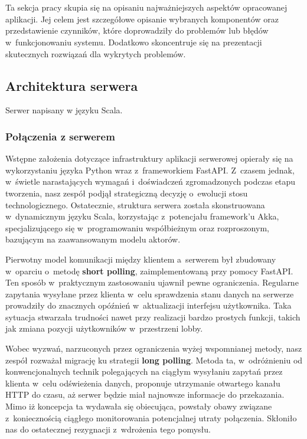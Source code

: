 \chapter{\ChapterTitleRealizationAspects}
\label{sec:wybrane-aspekty-realizacji}

Ta sekcja pracy skupia się na opisaniu najważniejszych aspektów
opracowanej aplikacji.
Jej celem jest szczegółowe opisanie wybranych
komponentów oraz przedstawienie czynników, które doprowadziły do
problemów lub błędów w~funkcjonowaniu systemu. Dodatkowo skoncentruje
się na prezentacji skutecznych rozwiązań dla wykrytych problemów.

\section{Architektura serwera}
Serwer napisany w języku Scala.






\subsection{Połączenia z serwerem}
Wstępne założenia dotyczące infrastruktury aplikacji
serwerowej opierały się na wykorzystaniu języka Python
wraz z~frameworkiem FastAPI. Z~czasem jednak, w~świetle
narastających wymagań i~doświadczeń zgromadzonych
podczas etapu tworzenia, nasz zespół podjął
strategiczną decyzję o~ewolucji stosu technologicznego.
Ostatecznie, struktura serwera została skonstruowana
w~dynamicznym języku Scala, korzystając z~potencjału
framework'u Akka, specjalizującego się w~programowaniu
współbieżnym oraz rozproszonym, bazującym na
zaawansowanym modelu aktorów.

Pierwotny model komunikacji między klientem a~serwerem
był zbudowany w~oparciu o~metodę \textbf{short polling},
zaimplementowaną przy pomocy FastAPI. Ten sposób
w~praktycznym zastosowaniu ujawnił pewne ograniczenia.
Regularne zapytania wysyłane przez klienta w~celu
sprawdzenia stanu danych na serwerze prowadziły do
znacznych opóźnień w~aktualizacji interfejsu
użytkownika. Taka sytuacja stwarzała trudności nawet
przy realizacji bardzo prostych funkcji, takich jak
zmiana pozycji użytkowników w~przestrzeni lobby.

Wobec wyzwań, narzuconych przez ograniczenia wyżej wspomnianej metody, nasz
zespół rozważał migrację ku strategii \textbf{long polling}. Metoda ta,
w~odróżnieniu od konwencjonalnych technik polegających na ciągłym
wysyłaniu zapytań przez klienta w~celu odświeżenia danych, proponuje
utrzymanie otwartego kanału HTTP do czasu, aż serwer będzie miał
najnowsze informacje do przekazania. Mimo iż koncepcja ta wydawała się
obiecująca, powstały obawy związane z~koniecznością ciągłego monitorowania
potencjalnej utraty połączenia. Skłoniło nas do ostatecznej rezygnacji
z~wdrożenia tego pomysłu.

